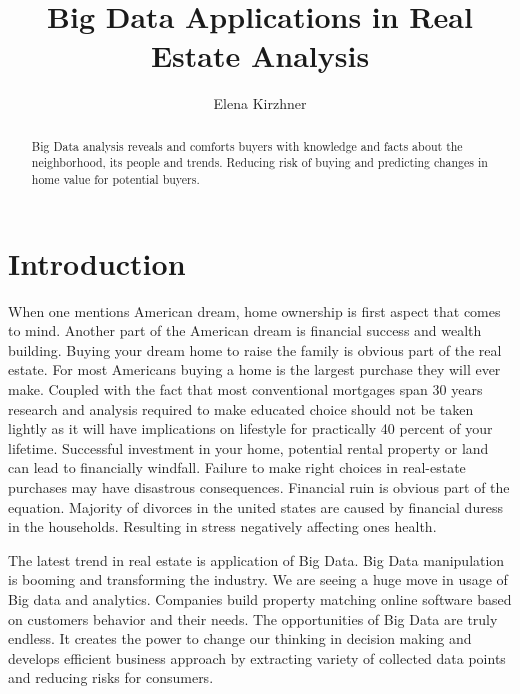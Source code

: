 \documentclass[sigconf]{acmart}
\begin{document}
\title{Big Data Applications in Real Estate Analysis}


\author{Elena Kirzhner}


\begin{abstract}

Big Data analysis reveals and comforts buyers with knowledge and facts about the neighborhood, its people and trends. Reducing risk of buying and predicting changes in home value for potential buyers.

\end{abstract}


\maketitle

\section{Introduction}

When one mentions American dream, home ownership is first aspect that comes to mind. Another part of the American dream is financial success and wealth building. Buying your dream home to raise the family is obvious part of the real estate.  For most Americans buying a home is the largest purchase they will ever make. Coupled with the fact that most conventional mortgages span 30 years research and analysis required to make educated choice should not be taken lightly as it will have implications on lifestyle for practically 40 percent of your lifetime.  Successful investment in your home, potential rental property or land can lead to financially windfall. Failure to make right choices in real-estate purchases may have disastrous consequences. Financial ruin is obvious part of the equation. Majority of divorces in the united states are caused by financial duress in the households. Resulting in stress negatively affecting one\textquotesingle s  health.

The latest trend in real estate is application of Big Data. Big Data manipulation is booming and transforming the industry. We are seeing a huge move in usage of Big data and analytics. Companies build property matching online software based on customers behavior and their needs. The opportunities of Big Data are truly endless. It creates the power to change our thinking in decision making and develops efficient business approach by extracting variety of collected data points and reducing risks for consumers.
\end{document}
